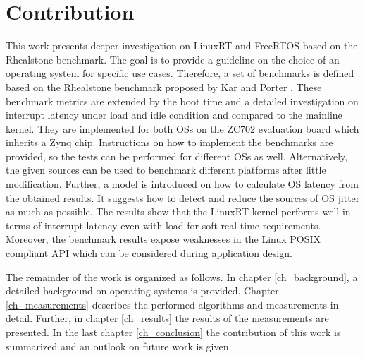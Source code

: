 \section{Contribution}
This work presents deeper investigation on LinuxRT and FreeRTOS based on the Rhealstone benchmark.
The goal is to provide a guideline on the choice of an operating system for specific use cases.
Therefore, a set of benchmarks is defined based on the Rhealstone benchmark proposed by Kar and Porter \cite{kar:itrb} \cite{kar:artbp}. 
These benchmark metrics are extended by the boot time and a detailed investigation on interrupt latency under load and idle condition and compared to the mainline kernel.
They are implemented for both \acp{OS} on the ZC702 evaluation board which inherits a Zynq chip. 
Instructions on how to implement the benchmarks are provided, so the tests can be performed for different \acp{OS} as well.
Alternatively, the given sources can be used to benchmark different platforms after little modification.
Further, a model is introduced on how to calculate OS latency from the obtained results. 
It suggests how to detect and reduce the sources of OS jitter as much as possible. 
The results show that the LinuxRT kernel performs well in terms of interrupt latency even with load for soft real-time requirements.
Moreover, the benchmark results expose weaknesses in the Linux POSIX compliant \ac{API} which can be considered during application design. 
\par
The remainder of the work is organized as follows. In chapter \ref{ch_background}, a detailed background on operating systems is provided. 
Chapter \ref{ch_measurements} describes the performed algorithms and measurements in detail. 
Further, in chapter \ref{ch_results} the results of the measurements are presented. 
In the last chapter \ref{ch_conclusion} the contribution of this work is summarized and an outlook on future work is given.